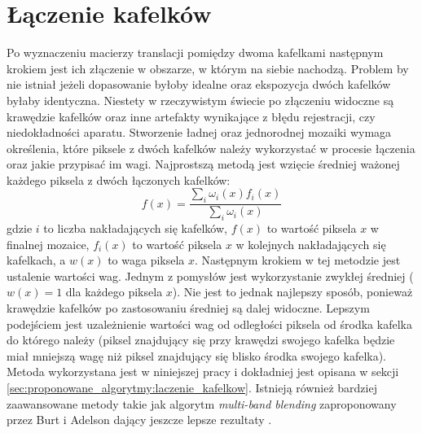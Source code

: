 \section{Łączenie kafelków}
\label{sec:algorytmy_korejestracji:laczenie_kafelkow}

Po wyznaczeniu macierzy translacji pomiędzy dwoma kafelkami następnym krokiem jest ich złączenie w obszarze, w którym na siebie nachodzą. Problem by nie istniał jeżeli dopasowanie byłoby idealne oraz ekspozycja dwóch kafelków byłaby identyczna. Niestety w rzeczywistym świecie po złączeniu widoczne są krawędzie kafelków oraz inne artefakty wynikające z błędu rejestracji, czy niedokładności aparatu. Stworzenie ładnej oraz jednorodnej mozaiki wymaga określenia, które piksele z dwóch kafelków należy wykorzystać w procesie łączenia oraz jakie przypisać im wagi. Najprostszą metodą jest wzięcie średniej ważonej każdego piksela z dwóch łączonych kafelków:
\begin{equation}
f(x)=\frac{\sum_{i}\omega_{i}(x)f_{i}(x)}{\sum_{i}\omega_{i}(x)}
\label{eq:blending}
\end{equation}
gdzie $i$ to liczba nakładających się kafelków, $f(x)$ to wartość piksela $x$ w finalnej mozaice, $f_{i}(x)$ to wartość piksela $x$ w kolejnych nakładających się kafelkach, a $w(x)$ to waga piksela $x$. Następnym krokiem w tej metodzie jest ustalenie wartości wag. Jednym z pomysłów jest wykorzystanie zwykłej średniej ($w(x)=1$ dla każdego piksela $x$). Nie jest to jednak najlepszy sposób, ponieważ krawędzie kafelków po zastosowaniu średniej są dalej widoczne. Lepszym podejściem jest uzależnienie wartości wag od odległości piksela od środka kafelka do którego należy (piksel znajdujący się przy krawędzi swojego kafelka będzie miał mniejszą wagę niż piksel znajdujący się blisko środka swojego kafelka). Metoda wykorzystana jest w niniejszej pracy i dokładniej jest opisana w sekcji \ref{sec:proponowane_algorytmy:laczenie_kafelkow}. Istnieją również bardziej zaawansowane metody takie jak algorytm \textit{multi-band blending} zaproponowany przez Burt i Adelson \cite{Burt:1983:MSA:245.247} dający jeszcze lepsze rezultaty \cite{Brown:2007:API:1265138.1265141}.
